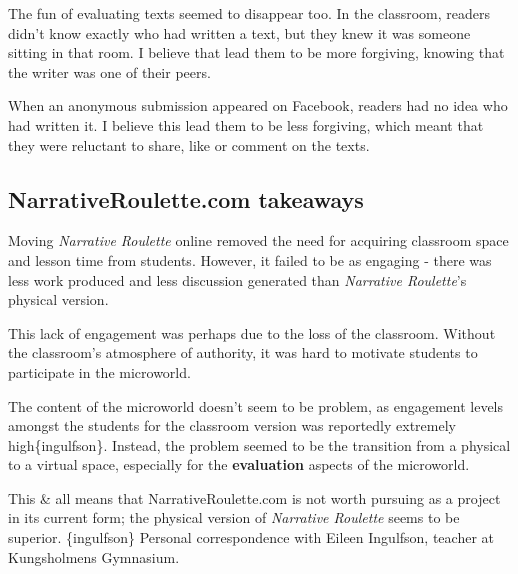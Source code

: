 The fun of evaluating texts seemed to disappear too. In the classroom,
readers didn't know exactly who had written a text, but they knew it was
someone sitting in that room. I believe that lead them to be more
forgiving, knowing that the writer was one of their peers.

When an anonymous submission appeared on Facebook, readers had no idea
who had written it. I believe this lead them to be less forgiving, which
meant that they were reluctant to share, like or comment on the texts.

\subsection{NarrativeRoulette.com takeaways}

Moving \emph{Narrative Roulette} online removed the need for acquiring
classroom space and lesson time from students. However, it failed to be
as engaging - there was less work produced and less discussion generated
than \emph{Narrative Roulette}'s physical version.

This lack of engagement was perhaps due to the loss of the classroom.
Without the classroom's atmosphere of authority, it was hard to motivate
students to participate in the microworld.

The content of the microworld doesn't seem to be problem, as engagement
levels amongst the students for the classroom version was reportedly
extremely high\{ingulfson\}. Instead, the problem seemed to be the
transition from a physical to a virtual space, especially for the
\textbf{evaluation} aspects of the microworld.

{%
}
{%
\FL
This & all means that NarrativeRoulette.com is not worth pursuing as a
project in its current form; the physical version of \emph{Narrative
Roulette} seems to be superior.
\ML
\{ingulfson\} Personal correspondence with Eileen Ingulfson, teacher
at Kungsholmens Gymnasium.
\LL
}
